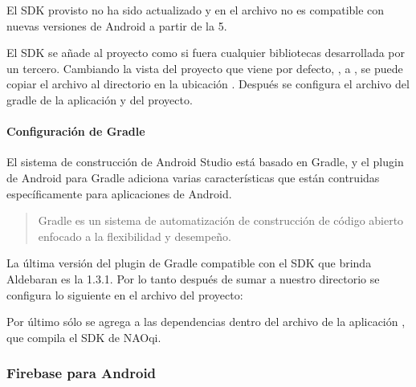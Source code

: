 El SDK provisto  no ha sido actualizado y en el archivo  no es compatible
con nuevas versiones de Android a partir de la 5.

El SDK se añade al proyecto como si fuera cualquier bibliotecas desarrollada
por un tercero. Cambiando la vista del proyecto que viene por defecto, ,
a , se puede copiar el archivo 
al directorio en la ubicación . Después se configura el archivo
del gradle de la aplicación y del proyecto.


\paragraph{Configuración de Gradle}
\label{\detokenize{dev_docs:configuracion-de-gradle}}
El sistema de construcción de Android Studio está basado en Gradle, y el plugin
de Android para Gradle adiciona varias características que están
contruidas específicamente para aplicaciones de Android.
\begin{quote}

Gradle es un sistema de automatización de construcción de código abierto
enfocado a la flexibilidad y desempeño.
\end{quote}

La última versión del plugin de Gradle compatible con el SDK que brinda
Aldebaran es la 1.3.1. Por lo tanto después de sumar a nuestro directorio
 se configura lo siguiente en el archivo  del
proyecto:

%
\begin{sphinxVerbatim}[commandchars=\\\{\}]
 
   
     
\end{sphinxVerbatim}

Por último sólo se agrega a las dependencias dentro del archivo 
de la aplicación , que
compila el SDK de NAOqi.


\subsubsection{Firebase para Android}
\label{\detokenize{dev_docs:firebase-para-android}}

